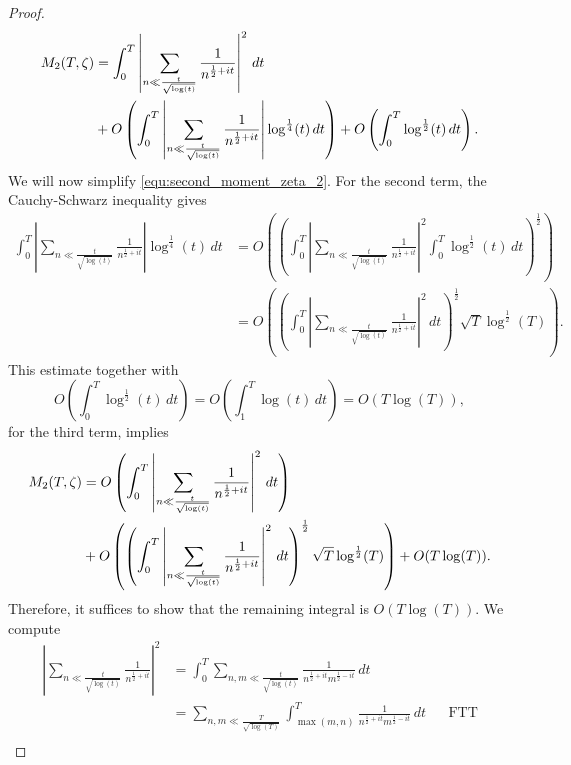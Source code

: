 \begin{proof}
\begin{equation}
\begin{aligned}
          M_{2}(T,\zeta) &= \int_{0}^{T}\left|\sum_{n \ll \frac{t}{\sqrt{\log(t)}}}\frac{1}{n^{\frac{1}{2}+it}}\right|^{2}\,dt \\
          &+ O\left(\int_{0}^{T}\left|\sum_{n \ll \frac{t}{\sqrt{\log(t)}}}\frac{1}{n^{\frac{1}{2}+it}}\right|\log^{\frac{1}{4}}(t)\,dt\right)+O\left(\int_{0}^{T}\log^{\frac{1}{2}}(t)\,dt\right).
        \end{aligned}
      \end{equation}
      We will now simplify \cref{equ:second_moment_zeta_2}. For the second term, the Cauchy-Schwarz inequality gives
      \begin{align*}
        \int_{0}^{T}\left|\sum_{n \ll \frac{t}{\sqrt{\log(t)}}}\frac{1}{n^{\frac{1}{2}+it}}\right|\log^{\frac{1}{4}}(t)\,dt &= O\left(\left(\int_{0}^{T}\left|\sum_{n \ll \frac{t}{\sqrt{\log(t)}}}\frac{1}{n^{\frac{1}{2}+it}}\right|^{2}\int_{0}^{T}\log^{\frac{1}{2}}(t)\,dt\right)^{\frac{1}{2}}\right) \\
        &= O\left(\left(\int_{0}^{T}\left|\sum_{n \ll \frac{t}{\sqrt{\log(t)}}}\frac{1}{n^{\frac{1}{2}+it}}\right|^{2}\,dt\right)^{\frac{1}{2}}\sqrt{T}\log^{\frac{1}{2}}(T)\right).
      \end{align*}
      This estimate together with
      \[
        O\left(\int_{0}^{T}\log^{\frac{1}{2}}(t)\,dt\right) = O\left(\int_{1}^{T}\log(t)\,dt\right) = O(T\log(T)),
      \]
      for the third term, implies
      \begin{equation}\label{equ:second_moment_zeta_3}
        \begin{aligned}
          M_{2}(T,\zeta) &= O\left(\int_{0}^{T}\left|\sum_{n \ll \frac{t}{\sqrt{\log(t)}}}\frac{1}{n^{\frac{1}{2}+it}}\right|^{2}\,dt\right) \\
          &+ O\left(\left(\int_{0}^{T}\left|\sum_{n \ll \frac{t}{\sqrt{\log(t)}}}\frac{1}{n^{\frac{1}{2}+it}}\right|^{2}\,dt\right)^{\frac{1}{2}}\sqrt{T}\log^{\frac{1}{2}}(T)\right)+O(T\log(T)).
        \end{aligned}
      \end{equation}
      Therefore, it suffices to show that the remaining integral is $O(T\log(T))$. We compute
      \begin{align*}
        \left|\sum_{n \ll \frac{t}{\sqrt{\log(t)}}}\frac{1}{n^{\frac{1}{2}+it}}\right|^{2} &= \int_{0}^{T}\sum_{n,m \ll \frac{t}{\sqrt{\log(t)}}}\frac{1}{n^{\frac{1}{2}+it}m^{\frac{1}{2}-it}}\,dt \\
        &= \sum_{n,m \ll \frac{T}{\sqrt{\log(T)}}}\int_{\max(m,n)}^{T}\frac{1}{n^{\frac{1}{2}+it}m^{\frac{1}{2}-it}}\,dt && \text{FTT} \\

\end{align*}
\end{proof}
